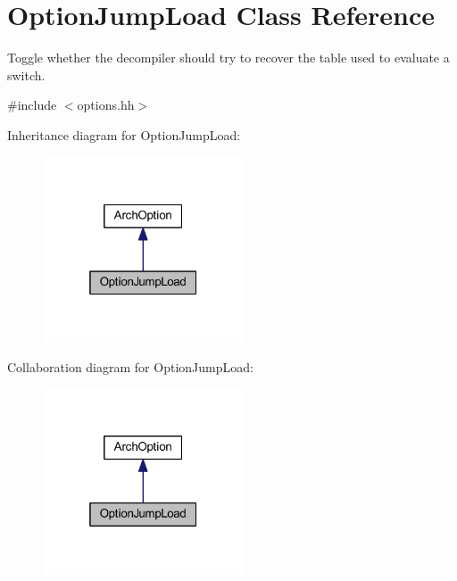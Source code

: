 \hypertarget{class_option_jump_load}{}\section{Option\+Jump\+Load Class Reference}
\label{class_option_jump_load}


Toggle whether the decompiler should try to recover the table used to evaluate a switch.  




{\ttfamily \#include $<$options.\+hh$>$}



Inheritance diagram for Option\+Jump\+Load\+:
\nopagebreak
\begin{figure}[H]
\begin{center}
\leavevmode
\includegraphics[width=169pt]{class_option_jump_load__inherit__graph}
\end{center}
\end{figure}


Collaboration diagram for Option\+Jump\+Load\+:
\nopagebreak
\begin{figure}[H]
\begin{center}
\leavevmode
\includegraphics[width=169pt]{class_option_jump_load__coll__graph}
\end{center}
\end{figure}
